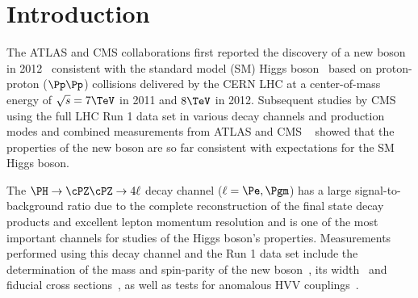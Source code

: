 \section{Introduction}
\label{sec:intro}

The ATLAS and CMS collaborations first reported the discovery of a new boson in 2012~\cite{Chatrchyan:2012ufa,Aad:2012tfa}
consistent with the standard model (SM) Higgs 
boson~\cite{Englert:1964et,Higgs:1964ia,Higgs:1964pj,Guralnik:1964eu,Higgs:1966ev,Kibble:1967sv} 
based on proton-proton ($\Pp\Pp$) collisions delivered by the CERN LHC at a center-of-mass energy of 
$\sqrt{s}=7\TeV$ in 2011 and $8\TeV$ in 2012. 
Subsequent studies by CMS using the full LHC Run 1 data set in various decay channels and production modes 
and combined measurements from ATLAS and CMS ~\cite{CMS:2014ega, AtlasProperties, Aad:2015zhl, CMS:2015kwa}
showed that the properties of the new boson are so far consistent with expectations for the SM Higgs boson.

The $\HZZfl$ decay channel ($\ell=\Pe,\Pgm$) has a large signal-to-background ratio due to the 
complete reconstruction of the final state decay products and excellent lepton momentum resolution
and is one of the most important channels for studies of the Higgs boson's properties. 
Measurements performed using this decay channel and the Run 1 data set include the determination of 
the mass and spin-parity of the new boson~\cite{CMSH4lLegacy,CMSH4lSpinParity,CMSH4lAnomalousCouplings}, 
its width~\cite{CMSH4lWidth,CMSH4lLifetime} and fiducial cross sections~\cite{CMSH4lFiducial8TeV}, as well as 
tests for anomalous HVV couplings~\cite{CMSH4lAnomalousCouplings,CMSH4lLifetime}. 

